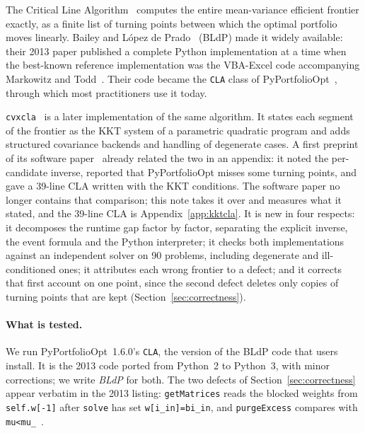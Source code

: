 \documentclass[11pt,a4paper]{article}
\newcommand{\code}[1]{\texttt{#1}}
\newcommand{\cvxcla}{\code{cvxcla}}
\begin{document}
The Critical Line Algorithm~\cite{markowitz1956} computes the entire
mean-variance efficient frontier exactly, as a finite list of turning points
between which the optimal portfolio moves linearly. Bailey and López de
Prado~\cite{bailey2013} (BLdP) made it widely available: their 2013 paper
published a complete Python implementation at a time when the best-known
reference implementation was the VBA-Excel code accompanying Markowitz and
Todd~\cite{markowitz2000}. Their code became the \code{CLA} class of
PyPortfolioOpt~\cite{pypfopt}, through which most practitioners use it today.

\cvxcla{}~\cite{cvxcla,cvxclasoftware} is a later implementation of the same algorithm. It
states each segment of the frontier as the KKT system of a parametric quadratic
program and adds structured covariance backends and handling of degenerate
cases. A first preprint of its software paper~\cite{cvxcla} already related
the two in an appendix: it noted the per-candidate inverse, reported that
PyPortfolioOpt misses some turning points, and gave a 39-line CLA written with
the KKT conditions. The software paper no longer contains that comparison; this
note takes it over and measures what it stated, and the 39-line CLA is
Appendix~\ref{app:kktcla}. It is new in four respects: it
decomposes the runtime gap factor by factor, separating the explicit inverse,
the event formula and the Python interpreter; it checks both implementations
against an independent solver on 90 problems, including degenerate and
ill-conditioned ones; it attributes each wrong frontier to a defect; and it
corrects that first account on one point, since the second defect deletes only copies
of turning points that are kept (Section~\ref{sec:correctness}).

\paragraph{What is tested.} We run PyPortfolioOpt~1.6.0's \code{CLA}, the
version of the BLdP code that users install. It is the 2013 code ported from
Python~2 to Python~3, with minor corrections; we write \emph{BLdP} for both.
The two defects of Section~\ref{sec:correctness} appear verbatim in the 2013
listing: \code{getMatrices} reads the blocked weights from \code{self.w[-1]}
after \code{solve} has set \code{w[i\_in]=bi\_in}, and \code{purgeExcess}
compares with \code{mu<mu\_}~\cite[Snippets~5 and~8, Appendix~A.1]{bailey2013}.
\end{document}
